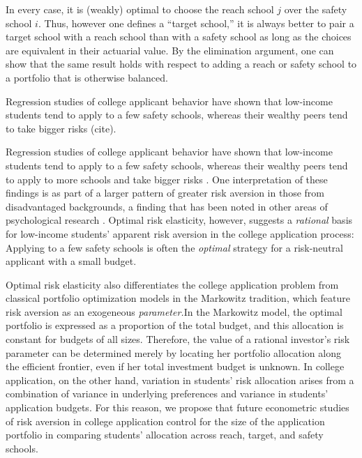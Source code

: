 \noindent In every case, it is (weakly) optimal to choose the reach school $j$ over the safety school $i$. Thus, however one defines a ``target school,'' it is always better to pair a target school with a reach school than with a safety school as long as the choices are equivalent in their actuarial value. By the elimination argument, one can show that the same result holds with respect to adding a reach or safety school to a portfolio that is otherwise balanced.

Regression studies of college applicant behavior have shown that low-income students tend to apply to a few safety schools, whereas their wealthy peers tend to take bigger risks (cite). 

Regression studies of college applicant behavior have shown that low-income students tend to apply to a few safety schools, whereas their wealthy peers tend to apply to more schools and take bigger risks \cite{hoxbyandavery2012}. One interpretation of these findings is as part of a larger pattern of greater risk aversion in those from disadvantaged backgrounds, a finding that has been noted in other areas of psychological research \cite{hartlaubandschneider2012,wattsetal2018,vanhuizenandalessie2019}. Optimal risk elasticity, however, suggests a \emph{rational} basis for low-income students' apparent risk aversion in the college application process: Applying to a few safety schools is often the \emph{optimal} strategy for a risk-neutral applicant with a small budget. %

Optimal risk elasticity also differentiates the college application problem from classical portfolio optimization models in the Markowitz \cite{markowitz1952} tradition, which feature risk aversion as an exogeneous \emph{parameter.}In the Markowitz model, the optimal portfolio is expressed as a proportion of the total budget, and this allocation is constant for budgets of all sizes. Therefore, the value of a rational investor's risk parameter can be determined merely by locating her portfolio allocation along the efficient frontier, even if her total investment budget is unknown. In college application, on the other hand, variation in students' risk allocation arises from a combination of variance in underlying preferences and variance in students' application budgets. For this reason, we propose that future econometric studies of risk aversion in college application control for the size of the application portfolio in comparing students' allocation across reach, target, and safety schools. 

